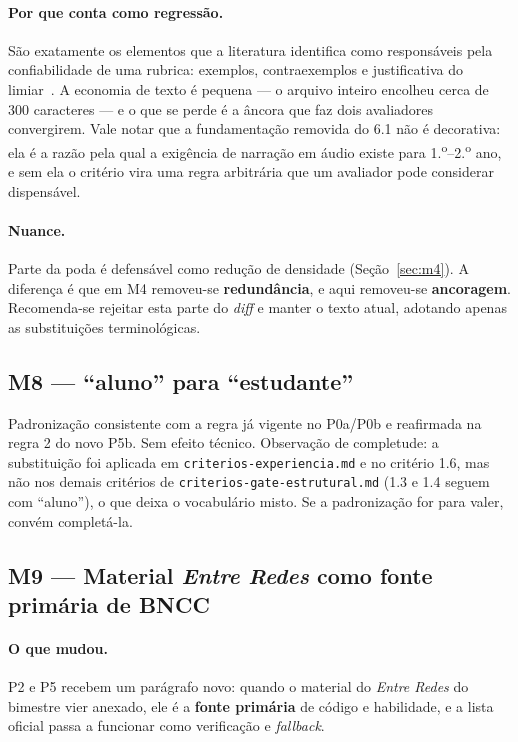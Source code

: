 \documentclass[11pt,a4paper]{article}
\newcommand{\cod}[1]{\texttt{\small #1}}
\begin{document}
\paragraph{Por que conta como regressão.} São exatamente os elementos que a literatura identifica como
responsáveis pela confiabilidade de uma rubrica: exemplos, contraexemplos e justificativa do
limiar~\cite{jonsson2007}. A economia de texto é pequena --- o arquivo inteiro encolheu cerca de 300
caracteres --- e o que se perde é a âncora que faz dois avaliadores convergirem. Vale notar que a
fundamentação removida do 6.1 não é decorativa: ela é a razão pela qual a exigência de narração em áudio
existe para 1.\textsuperscript{o}--2.\textsuperscript{o} ano, e sem ela o critério vira uma regra arbitrária
que um avaliador pode considerar dispensável.

\paragraph{Nuance.} Parte da poda é defensável como redução de densidade (Seção~\ref{sec:m4}). A diferença
é que em M4 removeu-se \textbf{redundância}, e aqui removeu-se \textbf{ancoragem}. Recomenda-se rejeitar
esta parte do \textit{diff} e manter o texto atual, adotando apenas as substituições terminológicas.

\subsection{M8 --- ``aluno'' para ``estudante''}

Padronização consistente com a regra já vigente no P0a/P0b e reafirmada na regra 2 do novo P5b. Sem efeito
técnico. Observação de completude: a substituição foi aplicada em \cod{criterios-experiencia.md} e no
critério 1.6, mas não nos demais critérios de \cod{criterios-gate-estrutural.md} (1.3 e 1.4 seguem com
``aluno''), o que deixa o vocabulário misto. Se a padronização for para valer, convém completá-la.

\subsection{M9 --- Material \textit{Entre Redes} como fonte primária de BNCC}
\label{sec:m9}

\paragraph{O que mudou.} P2 e P5 recebem um parágrafo novo: quando o material do \textit{Entre Redes} do
bimestre vier anexado, ele é a \textbf{fonte primária} de código e habilidade, e a lista oficial passa a
funcionar como verificação e \textit{fallback}.
\end{document}
